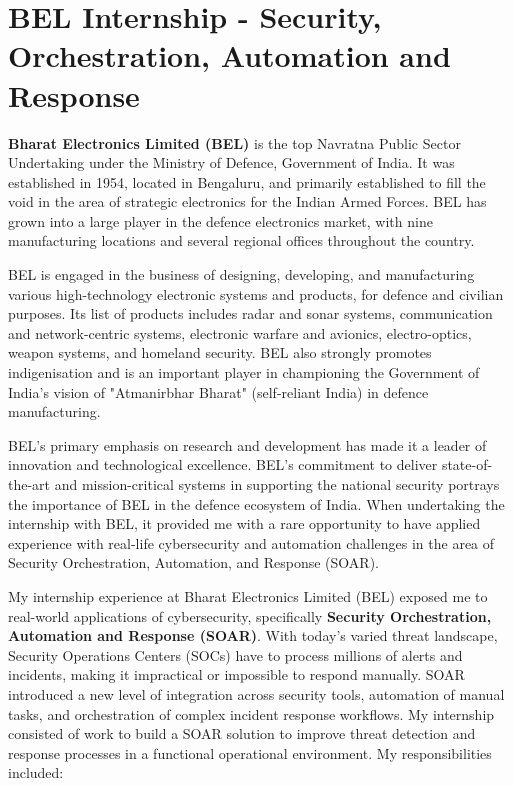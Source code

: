 \section{BEL Internship - Security, Orchestration, Automation and Response}

\textbf{Bharat Electronics Limited (BEL)} is the top Navratna Public Sector Undertaking under the Ministry of Defence, Government of India. It was established in 1954, located in Bengaluru, and primarily established to fill the void in the area of strategic electronics for the Indian Armed Forces. BEL has grown into a large player in the defence electronics market, with nine manufacturing locations and several regional offices throughout the country. 

BEL is engaged in the business of designing, developing, and manufacturing various high-technology electronic systems and products, for defence and civilian purposes. Its list of products includes radar and sonar systems, communication and network-centric systems, electronic warfare and avionics, electro-optics, weapon systems, and homeland security. BEL also strongly promotes indigenisation and is an important player in championing the Government of India's vision of "Atmanirbhar Bharat" (self-reliant India) in defence manufacturing.

BEL's primary emphasis on research and development has made it a leader of innovation and technological excellence. BEL's commitment to deliver state-of-the-art and mission-critical systems in supporting the national security portrays the importance of BEL in the defence ecosystem of India. When undertaking the internship with BEL, it provided me with a rare opportunity to have applied experience with real-life cybersecurity and automation challenges in the area of Security Orchestration, Automation, and Response (SOAR).

My internship experience at Bharat Electronics Limited (BEL) exposed me to real-world applications of cybersecurity, specifically \textbf{Security Orchestration, Automation and Response (SOAR)}. With today's varied threat landscape, Security Operations Centers (SOCs) have to process millions of alerts and incidents, making it impractical or impossible to respond manually. SOAR introduced a new level of integration across security tools, automation of manual tasks, and orchestration of complex incident response workflows. My internship consisted of work to build a SOAR solution to improve threat detection and response processes in a functional operational environment. My responsibilities included:

